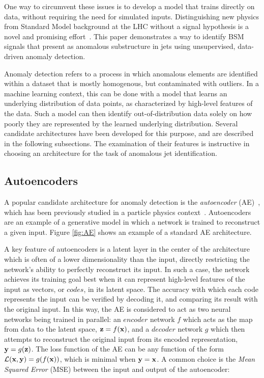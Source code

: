 \documentclass[11pt, a4paper]{article}
\begin{document}
One way to circumvent these issues is to develop a model that trains directly on data, without requiring the need for simulated inputs.
Distinguishing new physics from Standard Model background at the LHC without a signal hypothesis is a novel and promising effort~\cite{Heimel_2019, deepAutoencoders, CWoLa, cheng2021variational, bortolato2021bump}. 
This paper demonstrates a way to identify BSM signals that present as anomalous substructure in jets using unsupervised, data-driven anomaly detection. 

Anomaly detection refers to a process in which anomalous elements are identified within a dataset that is mostly homogenous, but contaminated with outliers. 
In a machine learning context, this can be done with a model that learns an underlying distribution of data points, as characterized by high-level features of the data. 
Such a model can then identify out-of-distribution data solely on how poorly they are represented by the learned underlying distribution. 
Several candidate architectures have been developed for this purpose, and are described in the following subsections.
The examination of their features is instructive in choosing an architecture for the task of anomalous jet identification.

\subsection{Autoencoders}

A popular candidate architecture for anomaly detection is the \textit{autoencoder} 
(AE)~\cite{bank2020autoencoders}, which has been previously studied in a particle physics context~\cite{Farina_2020, Heimel_2019}.
Autoencoders are an example of a generative model in which a network is trained to reconstruct a given input. 
Figure \ref{fig:AE} shows an example of a standard AE architecture.

A key feature of autoencoders is a latent layer in the center of the architecture which is often of a lower dimensionality than the input, directly restricting the network's ability to perfectly reconstruct its input. 
In such a case, the network achieves its training goal best when it can represent high-level features of the input as vectors, or $codes$, in its latent space. 
The accuracy with which each code represents the input can be verified by decoding it, and comparing its result with the original input. 
In this way, the AE is considered to act as two neural networks being trained in parallel: an $encoder$ network $f$
which acts as the map from data to the latent space, ${\textbf z}=f({\textbf x})$, and
a $decoder$ network $g$ which then attempts to reconstruct the original input from 
its encoded representation, ${\textbf y}=g({\textbf z})$. 
The loss function of the AE can be any function of the form $\mathcal{L}({\textbf x}, {\textbf y})=g(f({\textbf x}))$, which 
is minimal when ${\textbf y}={\textbf x}$. 
A common choice is the {\it Mean Squared Error} (MSE)
between the input and output of the autoencoder:
\end{document}
